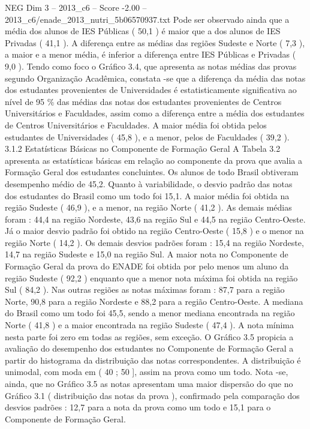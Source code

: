 \begin{textsample}{NEG Dim 3 – 2013\_c6 – Score -2.00 – 2013\_c6/enade\_2013\_nutri\_5b06570937.txt}
Pode ser observado ainda que a média dos alunos de IES Públicas ( 50,1 ) é maior que a dos alunos de IES Privadas ( 41,1 ).
A diferença entre as médias das regiões Sudeste e Norte ( 7,3 ), a maior e a menor média, é inferior a diferença entre IES Públicas e Privadas ( 9,0 ).
Tendo como foco o Gráfico 3.4, que apresenta as notas médias das provas segundo Organização Acadêmica, constata -se que a diferença da média das notas dos estudantes provenientes de Universidades é estatisticamente significativa ao nível de 95 \% das médias das notas dos estudantes provenientes de Centros Universitários e Faculdades, assim como a diferença entre a média dos estudantes de Centros Universitários e Faculdades.
A maior média foi obtida pelos estudantes de Universidades ( 45,8 ), e a menor, pelos de Faculdades ( 39,2 ). 3.1.2 Estatísticas Básicas no Componente de Formação Geral A Tabela 3.2 apresenta as estatísticas básicas em relação ao componente da prova que avalia a Formação Geral dos estudantes concluintes.
Os alunos de todo Brasil obtiveram desempenho médio de 45,2.
Quanto à variabilidade, o desvio padrão das notas dos estudantes do Brasil como um todo foi 15,1.
A maior média foi obtida na região Sudeste ( 46,9 ), e a menor, na região Norte ( 41,2 ).
As demais médias foram : 44,4 na região Nordeste, 43,6 na região Sul e 44,5 na região Centro-Oeste.
Já o maior desvio padrão foi obtido na região Centro-Oeste ( 15,8 ) e o menor na região Norte ( 14,2 ).
Os demais desvios padrões foram : 15,4 na região Nordeste, 14,7 na região Sudeste e 15,0 na região Sul.
A maior nota no Componente de Formação Geral da prova do ENADE foi obtida por pelo menos um aluno da região Sudeste ( 92,2 ) enquanto que a menor nota máxima foi obtida na região Sul ( 84,2 ).
Nas outras regiões as notas máximas foram : 87,7 para a região Norte, 90,8 para a região Nordeste e 88,2 para a região Centro-Oeste.
A mediana do Brasil como um todo foi 45,5, sendo a menor mediana encontrada na região Norte ( 41,8 ) e a maior encontrada na região Sudeste ( 47,4 ).
A nota mínima nesta parte foi zero em todas as regiões, sem exceção.
O Gráfico 3.5 propicia a avaliação do desempenho dos estudantes no Componente de Formação Geral a partir do histograma da distribuição das notas correspondentes.
A distribuição é unimodal, com moda em ( 40 ; 50 ], assim na prova como um todo.
Nota -se, ainda, que no Gráfico 3.5 as notas apresentam uma maior dispersão do que no Gráfico 3.1 ( distribuição das notas da prova ), confirmado pela comparação dos desvios padrões : 12,7 para a nota da prova como um todo e 15,1 para o Componente de Formação Geral.

\end{textsample}
